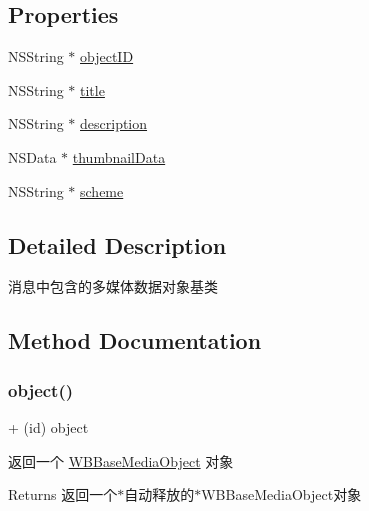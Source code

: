 \subsection*{Properties}
\begin{DoxyCompactItemize}
\item 
N\+S\+String $\ast$ \mbox{\hyperlink{interface_w_b_base_media_object_a3a539a158fa2b4be8ce6a0124dae7062}{object\+ID}}
\item 
N\+S\+String $\ast$ \mbox{\hyperlink{interface_w_b_base_media_object_ae9c683f03433157a29f97179435e3218}{title}}
\item 
N\+S\+String $\ast$ \mbox{\hyperlink{interface_w_b_base_media_object_aa4bc7a295712e9f7c0ff0eb3188019fe}{description}}
\item 
N\+S\+Data $\ast$ \mbox{\hyperlink{interface_w_b_base_media_object_ad5dffce0039743850c3666e8d29a8371}{thumbnail\+Data}}
\item 
N\+S\+String $\ast$ \mbox{\hyperlink{interface_w_b_base_media_object_a12181f275738183512c3bb4482eb58b6}{scheme}}
\end{DoxyCompactItemize}


\subsection{Detailed Description}
消息中包含的多媒体数据对象基类 

\subsection{Method Documentation}
\mbox{\label{interface_w_b_base_media_object_ab2df3d8d124732859fa7ebf5b9f3362f}} 
\subsubsection{\texorpdfstring{object()}{object()}\hspace{0.1cm}{\footnotesize\ttfamily [1/3]}}
{\footnotesize\ttfamily + (id) object \begin{DoxyParamCaption}{ }\end{DoxyParamCaption}}

返回一个 \mbox{\hyperlink{interface_w_b_base_media_object}{W\+B\+Base\+Media\+Object}} 对象

\begin{DoxyReturn}{Returns}
返回一个$\ast$自动释放的$\ast$\+W\+B\+Base\+Media\+Object对象 
\end{DoxyReturn}
\mbox{\label{interface_w_b_base_media_object_ab2df3d8d124732859fa7ebf5b9f3362f}} 
